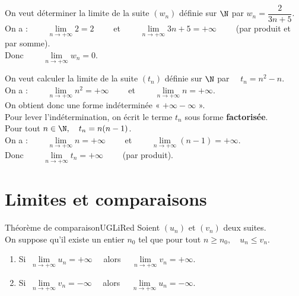 \documentclass[a4paper,11pt,cours]{nsi} %
\begin{document}
\begin{exemple}[]
    On veut déterminer la limite de la suite $(w_n)$ définie sur $\N$ par $w_n=\dfrac{2}{3n+5}$.\\[.5em]
    On a : $\qquad \lim\limits_{n\to+\infty} 2=2\qquad$ et $\qquad \lim\limits_{n\to+\infty} 3n+5 = +\infty \qquad$ (par produit et par somme).\\[.5em]
    Donc $\qquad \lim\limits_{n\to+\infty} w_n=0$.
\end{exemple}

\begin{methode}
    On veut calculer la limite de la suite $(t_n)$ définie sur $\N$ par $\quad t_n=n^2-n$.\\

    On a : $\qquad \lim\limits_{n\to+\infty} n^2=+\infty\qquad$ et $\qquad \lim\limits_{n\to+\infty} n=+\infty$.\\[.5em]
    On obtient donc une forme indéterminée « $+\infty-\infty$ ».\\

    \faLightbulb \hspace*{.3cm} Pour lever l'indétermination, on écrit le terme $t_n$ sous forme \textbf{factorisée}.\\
    Pour tout $n\in\N, \quad t_n=n(n-1)$.\\[.5em]
    On a : $\qquad \lim\limits_{n\to+\infty} n=+\infty\qquad$ et $\qquad \lim\limits_{n\to+\infty} (n-1)=+\infty$.\\[.5em]
    Donc $\qquad \lim\limits_{n\to+\infty} t_n=+\infty \qquad$ (par produit).
\end{methode}


\section{Limites et comparaisons}
\begin{encadrecolore}{Théorème de comparaison}{UGLiRed}
    Soient $(u_n)$ et $(v_n)$ deux suites.\\
    On suppose qu'il existe un entier $n_0$ tel que pour tout $n\geqslant n_0, \quad u_n\leqslant v_n$.
    \begin{enumerate}[label=\textbullet]
        \item Si $\ \lim\limits_{n\to+\infty}u_n=+\infty\quad$ alors $\quad \lim\limits_{n\to+\infty}v_n=+\infty$.
        \item Si $\ \lim\limits_{n\to+\infty}v_n=-\infty\quad$ alors $\quad \lim\limits_{n\to+\infty}u_n=-\infty$.
    \end{enumerate}
\end{encadrecolore}
\end{document}
